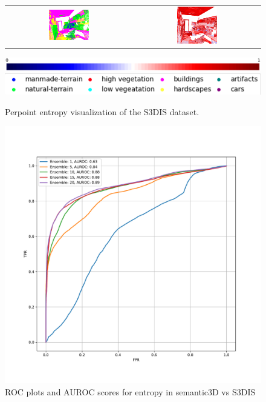 \begin{figure}[h!]
\begin{tabular}{cc}
            \includegraphics[width=0.33\textwidth, height=0.18\textheight]{images/seg_output/s3dis_DE/S3DIS_4_Pred.png}& 
            \includegraphics[width=0.33\textwidth, height=0.18\textheight]{images/seg_output/s3dis_DE/S3DIS_4_Entropy.png}\\
        \end{tabular}
        \includegraphics[scale=0.213]{images/color_legend.pdf}
        \includegraphics[scale=0.65]{images/legend.png}
        \caption{Perpoint entropy visualization of the S3DIS dataset.}
    \end{figure}
    \begin{figure}[h!]
        \centering
        \includegraphics[scale=0.65]{images/entropy_sem3dvs3dis_AUROC.pdf}
        \caption{ROC plots and AUROC scores for entropy in semantic3D vs S3DIS}
        \label{fig:AUROC_Ent_Sem3dvs3dis}
    \end{figure}




